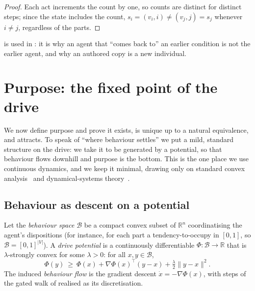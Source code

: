 \documentclass[11pt,twocolumn,a4paper]{article}
\newcommand{\R}{\mathbb{R}}
\newcommand{\V}{V}
\newcommand{\state}{s}
\newcommand{\Beh}{\mathcal{B}}       %
\newcommand{\abs}[1]{\lvert#1\rvert}
\newcommand{\norm}[1]{\lVert#1\rVert}
\begin{document}
\begin{proof}
Each act increments the count by one, so counts are distinct for distinct
steps; since the state includes the count, $\state_i=(v_i,i)\neq
(v_j,j)=\state_j$ whenever $i\neq j$, regardless of the parts.
\end{proof}

 is used in : it is why an
agent that ``comes back to'' an earlier condition is not the earlier
agent, and why an authored copy is a new individual.

\section{Purpose: the fixed point of the drive}
\label{sec:purpose}

We now define purpose and prove it exists, is unique up to a natural
equivalence, and attracts. To speak of ``where behaviour settles'' we put
a mild, standard structure on the drive: we take it to be generated by a
potential, so that behaviour flows downhill and purpose is the bottom.
This is the one place we use continuous dynamics, and we keep it minimal,
drawing only on standard convex analysis~\cite{rockafellar1970,%
boydvandenberghe2004} and dynamical-systems theory~\cite{khalil2002,%
hirschsmaledevaney2013}.

\subsection{Behaviour as descent on a potential}

\begin{definition}
\label{def:behspace}
Let the \emph{behaviour space} $\Beh$ be a compact convex subset of $\R^n$
coordinatising the agent's dispositions (for instance, for each part a
tendency-to-occupy in $[0,1]$, so $\Beh=[0,1]^{\abs\V}$). A \emph{drive
potential} is a continuously differentiable $\Phi:\Beh\to\R$ that is
$\lambda$-strongly convex for some $\lambda>0$: for all $x,y\in\Beh$,
\[
\Phi(y)\ \ge\ \Phi(x)+\nabla\Phi(x)^\top(y-x)+\tfrac{\lambda}{2}\norm{y-x}^2.
\]
The induced \emph{behaviour flow} is the gradient descent
$\dot x=-\nabla\Phi(x)$, with steps of the gated walk of
 realised as its discretisation.
\end{definition}
\end{document}
